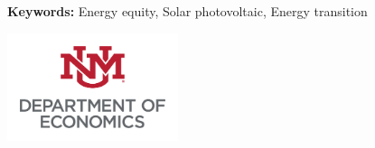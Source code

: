 \begin{titlepage}
\begin{center}
\begin{flushleft}
    \vspace{1em}
\textbf{Keywords:} Energy equity, Solar photovoltaic, Energy transition

\end{flushleft}

\includegraphics[width = 5cm]{figures/unm.png}






\end{center}

\end{titlepage}

